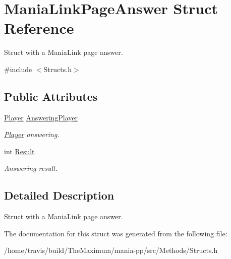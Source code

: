 \hypertarget{structManiaLinkPageAnswer}{\section{Mania\-Link\-Page\-Answer Struct Reference}
\label{structManiaLinkPageAnswer}
}


Struct with a Mania\-Link page answer.  




{\ttfamily \#include $<$Structs.\-h$>$}

\subsection*{Public Attributes}
\begin{DoxyCompactItemize}
\item 
\hypertarget{structManiaLinkPageAnswer_afb091a6cd4c5879232564816ce18422d}{\hyperlink{structPlayer}{Player} \hyperlink{structManiaLinkPageAnswer_afb091a6cd4c5879232564816ce18422d}{Answering\-Player}}\label{structManiaLinkPageAnswer_afb091a6cd4c5879232564816ce18422d}

\begin{DoxyCompactList}\small\item\em \hyperlink{structPlayer}{Player} answering. \end{DoxyCompactList}\item 
\hypertarget{structManiaLinkPageAnswer_a270ed5e3cf6a5dd74cca2c6c1d007ae1}{int \hyperlink{structManiaLinkPageAnswer_a270ed5e3cf6a5dd74cca2c6c1d007ae1}{Result}}\label{structManiaLinkPageAnswer_a270ed5e3cf6a5dd74cca2c6c1d007ae1}

\begin{DoxyCompactList}\small\item\em Answering result. \end{DoxyCompactList}\end{DoxyCompactItemize}


\subsection{Detailed Description}
Struct with a Mania\-Link page answer. 

The documentation for this struct was generated from the following file\-:\begin{DoxyCompactItemize}
\item 
/home/travis/build/\-The\-Maximum/mania-\/pp/src/\-Methods/Structs.\-h\end{DoxyCompactItemize}
